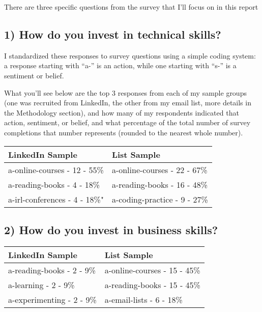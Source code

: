 \documentclass[13pt,]{tufte-handout}
\begin{document}
There are three specific questions from the survey that I'll focus on in
this report

\hypertarget{how-do-you-invest-in-technical-skills}{%
\subsection{1) How do you invest in technical
skills?}\label{how-do-you-invest-in-technical-skills}}


I standardized these responses to survey questions using a simple coding
system: a response starting with ``a-'' is an action, while one starting
with ``s-'' is a sentiment or belief.

What you'll see below are the top 3 responses from each of my sample
groups (one was recruited from LinkedIn, the other from my email list,
more details in the Methodology section), and how many of my respondents
indicated that action, sentiment, or belief, and what percentage of the
total number of survey completions that number represents (rounded to
the nearest whole number).

\begin{longtable}[]{@{}ll@{}}
\toprule
LinkedIn Sample & List Sample\tabularnewline
\midrule
\endhead
a-online-courses - 12 - 55\% & a-online-courses - 22 -
67\%\tabularnewline
a-reading-books - 4 - 18\% & a-reading-books - 16 - 48\%\tabularnewline
a-irl-conferences - 4 - 18\%" & a-coding-practice - 9 -
27\%\tabularnewline
\bottomrule
\end{longtable}

\newpage

\hypertarget{how-do-you-invest-in-business-skills}{%
\subsection{2) How do you invest in business
skills?}\label{how-do-you-invest-in-business-skills}}


\begin{longtable}[]{@{}ll@{}}
\toprule
LinkedIn Sample & List Sample\tabularnewline
\midrule
\endhead
a-reading-books - 2 - 9\% & a-online-courses - 15 - 45\%\tabularnewline
a-learning - 2 - 9\% & a-reading-books - 15 - 45\%\tabularnewline
a-experimenting - 2 - 9\% & a-email-lists - 6 - 18\%\tabularnewline
\bottomrule
\end{longtable}
\end{document}

